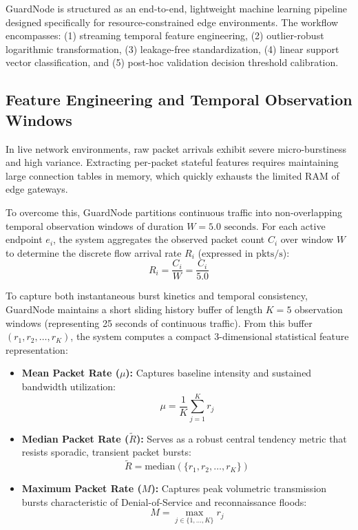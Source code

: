 \documentclass[conference]{IEEEtran}
\begin{document}
GuardNode is structured as an end-to-end, lightweight machine learning pipeline designed specifically for resource-constrained edge environments. The workflow encompasses: (1) streaming temporal feature engineering, (2) outlier-robust logarithmic transformation, (3) leakage-free standardization, (4) linear support vector classification, and (5) post-hoc validation decision threshold calibration.

\subsection{Feature Engineering and Temporal Observation Windows}
In live network environments, raw packet arrivals exhibit severe micro-burstiness and high variance. Extracting per-packet stateful features requires maintaining large connection tables in memory, which quickly exhausts the limited RAM of edge gateways.

To overcome this, GuardNode partitions continuous traffic into non-overlapping temporal observation windows of duration $W = 5.0\text{ seconds}$. For each active endpoint $e_i$, the system aggregates the observed packet count $C_i$ over window $W$ to determine the discrete flow arrival rate $R_i$ (expressed in $\text{pkts/s}$):
\begin{equation}
R_i = \frac{C_i}{W} = \frac{C_i}{5.0}
\end{equation}

To capture both instantaneous burst kinetics and temporal consistency, GuardNode maintains a short sliding history buffer of length $K = 5$ observation windows (representing 25 seconds of continuous traffic). From this buffer $(r_1, r_2, \dots, r_K)$, the system computes a compact 3-dimensional statistical feature representation:
\begin{itemize}
    \item \textbf{Mean Packet Rate ($\mu$):} Captures baseline intensity and sustained bandwidth utilization:
    \begin{equation}
    \mu = \frac{1}{K} \sum_{j=1}^K r_j
    \end{equation}
    \item \textbf{Median Packet Rate ($\tilde{R}$):} Serves as a robust central tendency metric that resists sporadic, transient packet bursts:
    \begin{equation}
    \tilde{R} = \text{median}(\{r_1, r_2, \dots, r_K\})
    \end{equation}
    \item \textbf{Maximum Packet Rate ($M$):} Captures peak volumetric transmission bursts characteristic of Denial-of-Service and reconnaissance floods:
    \begin{equation}
    M = \max_{j \in \{1, \dots, K\}} r_j
    \end{equation}
\end{itemize}
\end{document}
